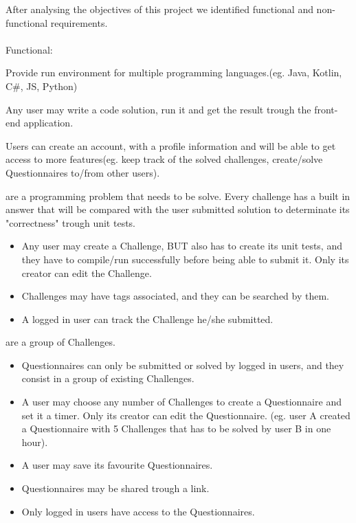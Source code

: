 \renewcommand{\labelitemii}{$\star$}
After analysing the objectives of this project we identified functional and non-functional requirements.
\\
\\
Functional:
\begin{description}[font=$\bullet$~\normalfont\scshape\color{red!50!black}]
\item [Multi-Language] Provide run environment for multiple programming languages.(eg. Java, Kotlin, C\#, JS, Python)

\item [Execute Solution] Any user may write a code solution, run it and get the result trough the front-end application.

\item [Basic Authentication] Users can create an account, with a profile information and will be able to get access to more features(eg. keep track of the solved challenges, create/solve Questionnaires to/from other users).

\item [Challenges] are a programming problem that needs to be solve. Every challenge has a built in answer that will be compared with the user submitted solution to determinate its "correctness" trough unit tests.
   \begin{itemize}
     \item Any user may create a Challenge, BUT also has to create its unit tests, and they have to compile/run successfully before being able to submit it. Only its creator can edit the Challenge.
     \item Challenges may have tags associated, and they can be searched by them.
     \item A logged in user can track the Challenge he/she submitted.
   \end{itemize}
\item[Questionnaires] are a group of Challenges.
	\begin{itemize}
	\item Questionnaires can only be submitted or solved by logged in users, and they consist in a group of existing Challenges.
    \item A user may choose any number of Challenges to create a Questionnaire and set it a timer. Only its creator can edit the Questionnaire.
    (eg. user A created a Questionnaire with 5 Challenges that has to be solved by user B in one hour).
    \item A user may save its favourite Questionnaires.
    \item Questionnaires may be shared trough a link.
    \item Only logged in users have access to the Questionnaires.
	\end{itemize}
\end{description}

